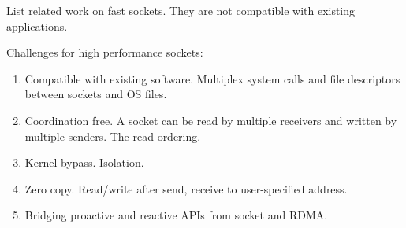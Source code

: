List related work on fast sockets. They are not compatible with existing applications.

Challenges for high performance sockets:
\begin{enumerate}
	\item Compatible with existing software. Multiplex system calls and file descriptors between sockets and OS files.
	\item Coordination free. A socket can be read by multiple receivers and written by multiple senders. The read ordering.
	\item Kernel bypass. Isolation.
	\item Zero copy. Read/write after send, receive to user-specified address.
	\item Bridging proactive and reactive APIs from socket and RDMA.
\end{enumerate}
